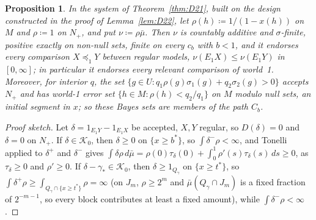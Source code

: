 \documentclass[11pt]{article}
\newtheorem{proposition}[theorem]{Proposition}
\theoremstyle{definition}
\theoremstyle{remark}
\begin{document}
\begin{proposition}\label{prop:D2sigma}
In the system of Theorem~\ref{thm:D21}, built on the design constructed in the proof of Lemma~\ref{lem:D22}, let $\rho(h)\coloneqq1/(1-x(h))$ on $M$ and $\rho\coloneqq1$ on $N_+$, and put $\nu\coloneqq\rho\bar\mu$. Then $\nu$ is countably additive and $\sigma$-finite, positive exactly on non-null sets, finite on every $c_b$ with $b<1$, and it endorses every comparison $X\preceq_1Y$ between regular models, $\nu(E_1X)\le\nu(E_1Y)$ in $[0,\infty]$; in particular it endorses every relevant comparison of world~1. Moreover, for interior $q$, the set $\{g\in U:q_1\rho(g)\sigma_1(g)+q_2\sigma_2(g)>0\}$ accepts $N_+$ and has world-1 error set $\{h\in M:\rho(h)<q_2/q_1\}$ on $M$ modulo null sets, an initial segment in $x$; so these Bayes sets are members of the path $C_b$.
\end{proposition}
\begin{proof}[Proof sketch]
Let $\delta=1_{E_1Y}-1_{E_1X}$ be accepted, $X,Y$ regular, so $D(\delta)=0$ and $\delta=0$ on $N_+$. If $\delta\in\mathcal K_0$, then $\delta\ge0$ on $\{x\ge b^*\}$, so $\int\delta^-\rho<\infty$, and Tonelli applied to $\delta^+$ and $\delta^-$ gives $\int\delta\rho\,d\bar\mu=\rho(0)\tau_\delta(0)+\int_0^1\rho'(s)\tau_\delta(s)\,ds\ge0$, as $\tau_\delta\ge0$ and $\rho'\ge0$. If $\delta-\gamma_*\in\mathcal K_0$, then $\delta\ge1_{Q_\gamma}$ on $\{x\ge t^*\}$, so $\int\delta^+\rho\ge\int_{Q_\gamma\cap\{x\ge t^*\}}\rho=\infty$ (on $J_m$, $\rho\ge2^m$ and $\bar\mu(Q_\gamma\cap J_m)$ is a fixed fraction of $2^{-m-1}$, so every block contributes at least a fixed amount), while $\int\delta^-\rho<\infty$.
\end{proof}
\end{document}
